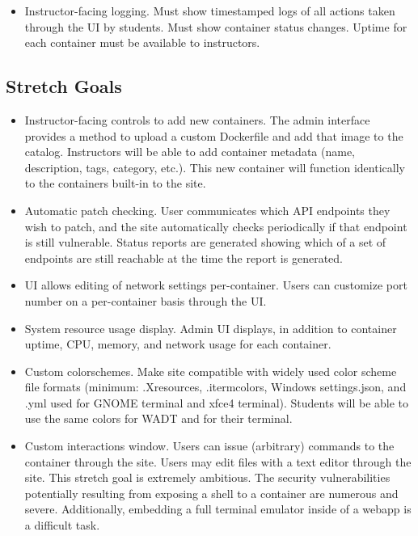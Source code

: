 \documentclass[12pt,titlepage]{article}
\begin{document}
\begin{itemize}
	\item Instructor-facing logging. Must show timestamped logs of all actions taken through the UI by students. Must show container status changes. Uptime for each container must be available to instructors.
\end{itemize}

\subsection{Stretch Goals}
\begin{itemize}
	\item Instructor-facing controls to add new containers. The admin interface provides a method to upload a custom Dockerfile and add that image to the catalog. Instructors will be able to add container metadata (name, description, tags, category, etc.). This new container will function identically to the containers built-in to the site.
	\item Automatic patch checking. User communicates which API endpoints they wish to patch, and the site automatically checks periodically if that endpoint is still vulnerable. Status reports are generated showing which of a set of endpoints are still reachable at the time the report is generated.
	\item UI allows editing of network settings per-container. Users can customize port number on a per-container basis through the UI.
	\item System resource usage display. Admin UI displays, in addition to container uptime, CPU, memory, and network usage for each container.
	\item Custom colorschemes.
	      Make site compatible with widely used color scheme file formats (minimum: .Xresources, .itermcolors, Windows settings.json, and .yml used for GNOME terminal and xfce4 terminal). Students will be able to use the same colors for WADT and for their terminal.
	\item Custom interactions window. Users can issue (arbitrary) commands to the container through the site. Users may edit files with a text editor through the site. This stretch goal is extremely ambitious. The security vulnerabilities potentially resulting from exposing a shell to a container are numerous and severe. Additionally, embedding a full terminal emulator inside of a webapp is a difficult task.
\end{itemize}
\end{document}
